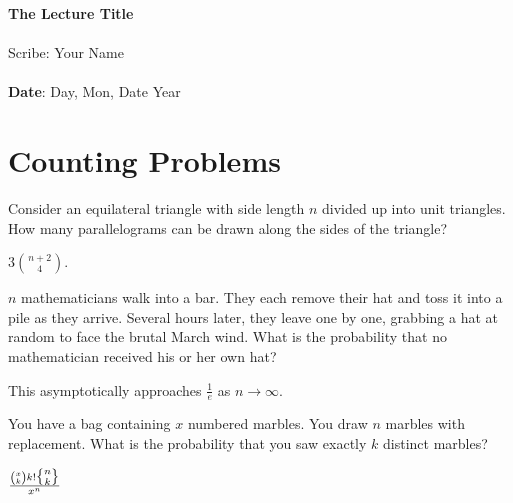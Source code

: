\documentclass[11pt,twosided]{article}
\def\titlestring{The Lecture Title}
\def\scribestring{Your Name}
\def\datestring{Day, Mon, Date Year}
\begin{document}
\thispagestyle{plain}  %

\noindent
{\LARGE \textbf{\titlestring}}\\\\
%
{\Large Scribe: \scribestring}\\ \\
{\textbf{Date}: \datestring}


\noindent

\section{Counting Problems}
\begin{problem}{1}
Consider an equilateral triangle with side length $n$ divided up into unit triangles. How many parallelograms can be drawn along the sides of the triangle? 
\end{problem}

\begin{solution}
$3 \binom{n+2}{4}$. 
\end{solution}

\begin{problem}{2}
$n$ mathematicians walk into a bar. They each remove their hat and toss it into a pile as they arrive. Several hours later, they leave one by one, grabbing a hat at random to face the brutal March wind. What is the probability that no mathematician received his or her own hat? 
\end{problem}

\begin{solution}
This asymptotically approaches $\frac{1}{e}$ as $n \to \infty$. 
\end{solution}

\begin{problem}
You have a bag containing $x$ numbered marbles. You draw $n$ marbles with replacement. What is the probability that you saw exactly $k$ distinct marbles? 
\end{problem}

\begin{solution}
$\frac{\binom{x}{k} k! \stirii{n}{k}}{x^n}$
\end{solution}
\end{document}
